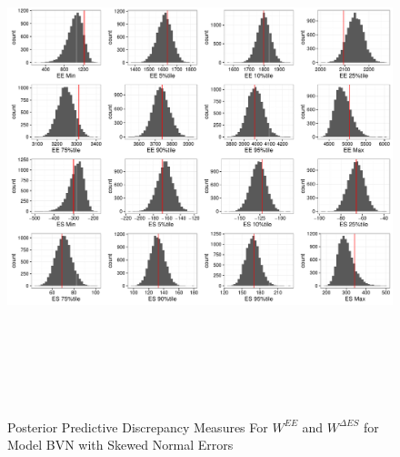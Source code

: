 \documentclass[11pt]{article}\usepackage[]{graphicx}\usepackage[]{color}
\begin{document}
  \begin{figure}
  \centering
  \includegraphics[width=17cm,height=15cm]{manual_figure/wpwdiagbvns.pdf}
  \caption{Posterior Predictive Discrepancy Measures For $W^{EE}$ and $W^{\Delta ES}$ for Model BVN with Skewed Normal Errors}
  \label{wpwdiagbvns}
  \end{figure}
\end{document}
